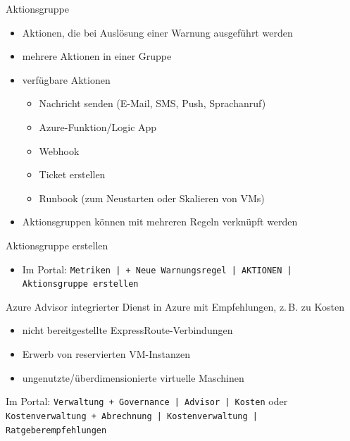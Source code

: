 
\begin{flashcard}[Definition]{Aktionsgruppe}
    \begin{itemize}
        \item Aktionen, die bei Auslösung einer Warnung ausgeführt werden
        \item mehrere Aktionen in einer Gruppe
        \item verfügbare Aktionen
            \begin{itemize}
                \item Nachricht senden (E-Mail, SMS, Push, Sprachanruf)
                \item Azure-Funktion/Logic App
                \item Webhook
                \item Ticket erstellen
                \item Runbook (zum Neustarten oder Skalieren von VMs)
            \end{itemize}
        \item Aktionsgruppen können mit mehreren Regeln verknüpft werden
    \end{itemize}
\end{flashcard}

\begin{flashcard}[Definition]{Aktionsgruppe erstellen}
    \begin{itemize}
        \item Im Portal:\newline
            \texttt{Metriken | + Neue Warnungsregel | AKTIONEN | Aktionsgruppe erstellen}
    \end{itemize}
\end{flashcard}


\begin{flashcard}[Definition]{Azure Advisor}
    integrierter Dienst in Azure mit Empfehlungen, z.\,B. zu Kosten
    \begin{itemize}
        \item nicht bereitgestellte ExpressRoute-Verbindungen
        \item Erwerb von reservierten VM-Instanzen
        \item ungenutzte/überdimensionierte virtuelle Maschinen
    \end{itemize}
    Im Portal: \texttt{Verwaltung + Governance | Advisor | Kosten}
    oder \texttt{Kostenverwaltung + Abrechnung | Kostenverwaltung | Ratgeberempfehlungen }
\end{flashcard}


